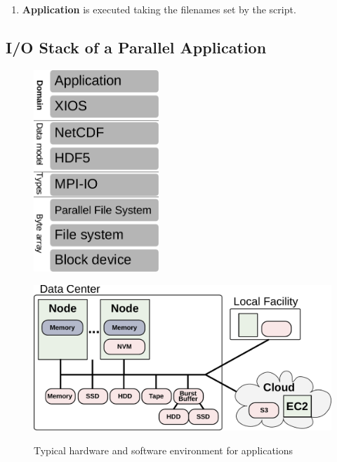 \documentclass{superfri}
\begin{document}
\begin{enumerate}
  \item \textbf{Application} is executed taking the filenames set by the script.

\end{enumerate}

\subsection{I/O Stack of a Parallel Application}

\begin{figure}[b]
    \begin{minipage}{.42\linewidth}
        \centering
        \includegraphics[width=0.42\textwidth]{pic/layers-xios}
        \label{pic/layers-xios}
    \end{minipage}
    \begin{minipage}{.58\linewidth}
        \centering
        \includegraphics[width=1\textwidth]{pic/system}
        \label{pic/system}
    \end{minipage}
    \vspace{5pt}
    \caption{Typical hardware and software environment for applications}
    \label{fig:34}
\end{figure}
\end{document}
